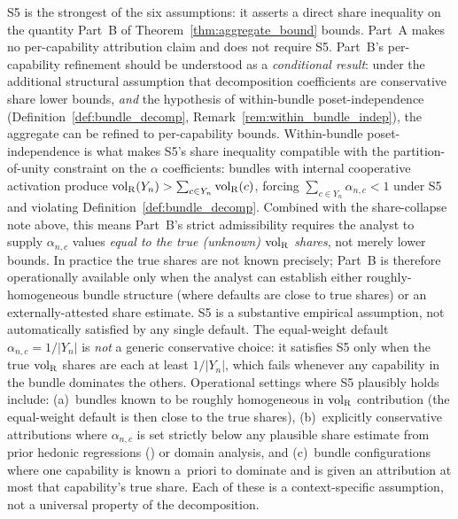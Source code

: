 \begin{remark}
\label{rem:s5_heavy}
S5 is the strongest of the six assumptions: it asserts a direct
share inequality on the quantity Part~B of
Theorem~\ref{thm:aggregate_bound} bounds.  Part~A makes no
per-capability attribution claim and does not require S5.
Part~B's per-capability refinement should be understood as a
\emph{conditional result}: under the additional structural
assumption that decomposition coefficients are conservative
share lower bounds, \emph{and} the hypothesis of within-bundle
poset-independence (Definition~\ref{def:bundle_decomp},
Remark~\ref{rem:within_bundle_indep}), the aggregate can be
refined to per-capability bounds.  Within-bundle
poset-independence is what makes S5's share inequality
compatible with the partition-of-unity constraint on the
$\alpha$ coefficients: bundles with internal cooperative
activation produce ${\operatorname{vol}_{\mathrm{R}}}(Y_n) > \sum_{c \in Y_n} {\operatorname{vol}_{\mathrm{R}}}(c)$,
forcing $\sum_{c \in Y_n} \alpha_{n,c} < 1$ under S5 and
violating Definition~\ref{def:bundle_decomp}.  Combined with
the share-collapse note above, this means Part~B's strict
admissibility requires the analyst to supply
$\alpha_{n,c}$ values \emph{equal to the true (unknown)
${\operatorname{vol}_{\mathrm{R}}}$ shares}, not merely lower bounds.  In practice the
true shares are not known precisely; Part~B is therefore
operationally available only when the analyst can establish
either roughly-homogeneous bundle structure (where defaults
are close to true shares) or an externally-attested share
estimate.  S5 is a substantive empirical assumption, not
automatically satisfied by any single default.  The equal-weight default
$\alpha_{n,c} = 1/|Y_n|$ is \emph{not} a generic conservative
choice: it satisfies S5 only when the true ${\operatorname{vol}_{\mathrm{R}}}$ shares are
each at least $1/|Y_n|$, which fails whenever any capability in
the bundle dominates the others.  Operational settings where S5
plausibly holds include: (a)~bundles known to be roughly
homogeneous in ${\operatorname{vol}_{\mathrm{R}}}$ contribution (the equal-weight default
is then close to the true shares), (b)~explicitly conservative
attributions where $\alpha_{n,c}$ is set strictly below any
plausible share estimate from prior hedonic regressions
(\citealp{rosen1974hedonic}) or domain analysis, and (c)~bundle
configurations where one capability is known a~priori to
dominate and is given an attribution at most that capability's
true share.  Each of these is a context-specific assumption,
not a universal property of the decomposition.
\end{remark}

